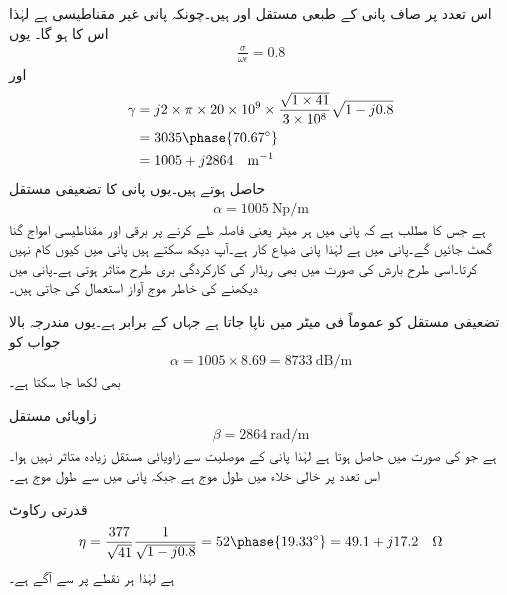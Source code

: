 اس تعدد پر صاف پانی کے طبعی مستقل  اور  ہیں۔چونکہ پانی غیر مقناطیسی ہے لہٰذا اس کا  ہو گا۔ یوں
\begin{align*}
\frac{\sigma}{\omega \epsilon}=0.8
\end{align*}
اور
\begin{align*}
\gamma&=j 2\times \pi \times 20\times 10^9 \times \frac{\sqrt{1\times 41}}{3\times 10^8} \sqrt{1-j 0.8}\\
&=3035 \phase{70.67^{\circ}}\\
&=1005+j2864 \quad \si{\meter^{-1}}
\end{align*}
حاصل ہوتے ہیں۔یوں پانی کا تضعیفی مستقل
\begin{align*}
\alpha=\SI{1005}{\neper \per \meter}
\end{align*}
ہے جس کا مطلب ہے کہ پانی میں ہر  میٹر یعنی  فاصلہ طے  کرنے پر برقی اور مقناطیسی امواج  گنا گھٹ جائیں گے۔پانی میں  ہے لہٰذا پانی ضیاع کار ہے۔آپ دیکھ سکتے ہیں  پانی میں کیوں کام نہیں کرتا۔اسی طرح بارش کی صورت میں بھی ریڈار کی کارکردگی بری طرح متاثر ہوتی ہے۔پانی میں دیکھنے کی خاطر موج آواز استعمال کی جاتی ہیں۔

تضعیفی مستقل کو عموماً  فی میٹر میں ناپا جاتا ہے جہاں  کے برابر ہے۔یوں مندرجہ بالا جواب کو
\begin{align*}
\alpha=1005\times 8.69=\SI{8733}{\deci\bel\per\meter}
\end{align*}
بھی لکھا جا سکتا ہے۔

زاویائی مستقل
\begin{align*}
\beta=\SI{2864}{\radian \per \meter}
\end{align*}
ہے جو  کی صورت میں  حاصل ہوتا ہے لہٰذا پانی کے موصلیت سے زاویائی مستقل زیادہ متاثر نہیں ہوا۔ اس تعدد پر خالی خلاء میں طول موج  ہے جبکہ پانی میں  سے طول موج  ہے۔

قدرتی رکاوٹ
\begin{align*}
\eta=\frac{377}{\sqrt{41}}\frac{1}{\sqrt{1-j 0.8}}=52\phase{19.33^\circ}=49.1+j17.2 \quad \si{\ohm}
\end{align*}
ہے لہٰذا  ہر نقطے پر  سے  آگے ہے۔


